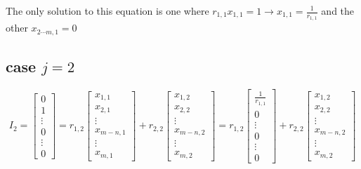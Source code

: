 \documentclass[a4paper,12pt]{article}
\begin{document}
The only solution to this equation is one where $r_{1,1} x_{1,1} = 1 \rightarrow x_{1,1}=\frac{1}{r_{1,1}}$ and the other $x_{2\cdots m,1}=0$


\subsection{case $j=2$ }



\begin{equation}
I_2 =\begin{bmatrix}
           0 \\
           1 \\
           \vdots \\
           0 \\
           \vdots \\
           0
         \end{bmatrix} = r_{1,2} \begin{bmatrix}
           x_{1,1} \\
           x_{2,1} \\
           \vdots \\
           x_{m-n,1} \\
           \vdots \\
           x_{m,1}
         \end{bmatrix} + r_{2,2} \begin{bmatrix}
           x_{1,2} \\
           x_{2,2} \\
           \vdots \\
           x_{m-n,2} \\
           \vdots \\
           x_{m,2}
           \end{bmatrix} =  r_{1,2} \begin{bmatrix}
           \frac{1}{r_{1,1}} \\
           0 \\
           \vdots \\
           0 \\
           \vdots \\
           0
         \end{bmatrix} + r_{2,2} \begin{bmatrix}
           x_{1,2} \\
           x_{2,2} \\
           \vdots \\
           x_{m-n,2} \\
           \vdots \\
           x_{m,2}
           \end{bmatrix}
\end{equation}
\end{document}
